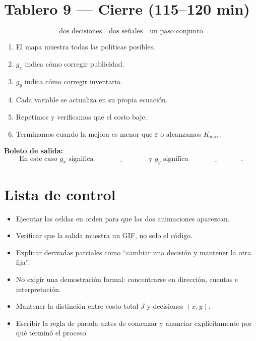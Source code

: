 \documentclass[11pt]{article}
\begin{document}
\section*{Tablero 9 --- Cierre (115--120 min)}
\[
\boxed{\text{dos decisiones}\quad\text{dos señales}\quad\text{un paso conjunto}}
\]
\begin{enumerate}
\item El mapa muestra todas las políticas posibles.
\item $g_x$ indica cómo corregir publicidad.
\item $g_y$ indica cómo corregir inventario.
\item Cada variable se actualiza en su propia ecuación.
\item Repetimos y verificamos que el costo baje.
\item Terminamos cuando la mejora es menor que $\varepsilon$ o alcanzamos
      $K_{\max}$.
\end{enumerate}

\textbf{Boleto de salida:}
\[
\boxed{\text{En este caso }g_x\text{ significa }\underline{\hspace{3cm}}
\text{ y }g_y\text{ significa }\underline{\hspace{3cm}}.}
\]

\section*{Lista de control}
\begin{itemize}[leftmargin=1.5em]
\item Ejecutar las celdas en orden para que las dos animaciones aparezcan.
\item Verificar que la salida muestra un GIF, no solo el código.
\item Explicar derivadas parciales como ``cambiar una decisión y mantener la otra fija''.
\item No exigir una demostración formal: concentrarse en dirección, cuentas e interpretación.
\item Mantener la distinción entre costo total $J$ y decisiones $(x,y)$.
\item Escribir la regla de parada antes de comenzar y anunciar explícitamente
      por qué terminó el proceso.
\end{itemize}
\end{document}
